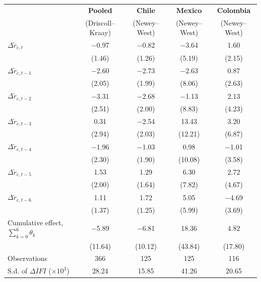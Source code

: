 \begin{tabular}{@{} l cccc @{}}
\toprule
 & \textbf{Pooled} & \textbf{Chile} & \textbf{Mexico} & \textbf{Colombia} \\
 & (Driscoll--Kraay) & (Newey--West) & (Newey--West) & (Newey--West) \\
\midrule
$\Delta\tilde r_{c,t}$ & $-$0.97 & $-$0.82 & $-$3.64 & 1.60 \\
 & (1.46) & (1.26) & (5.19) & (2.15) \\
$\Delta\tilde r_{c,t-1}$ & $-$2.60 & $-$2.73 & $-$2.63 & 0.87 \\
 & (2.05) & (1.99) & (8.06) & (2.63) \\
$\Delta\tilde r_{c,t-2}$ & $-$3.31 & $-$2.68 & $-$1.13 & 2.13 \\
 & (2.51) & (2.00) & (8.83) & (4.23) \\
$\Delta\tilde r_{c,t-3}$ & 0.31 & $-$2.54 & 13.43 & 3.20 \\
 & (2.94) & (2.03) & (12.21) & (6.87) \\
$\Delta\tilde r_{c,t-4}$ & $-$1.96 & $-$1.03 & 0.98 & $-$1.01 \\
 & (2.30) & (1.90) & (10.08) & (3.58) \\
$\Delta\tilde r_{c,t-5}$ & 1.53 & 1.29 & 6.30 & 2.72 \\
 & (2.00) & (1.64) & (7.82) & (4.67) \\
$\Delta\tilde r_{c,t-6}$ & 1.11 & 1.72 & 5.05 & $-$4.69 \\
 & (1.37) & (1.25) & (5.99) & (3.69) \\
\midrule
Cumulative effect, $\sum_{k=0}^{6}\theta_k$ & $-$5.89 & $-$6.81 & 18.36 & 4.82 \\
 & (11.64) & (10.12) & (43.84) & (17.80) \\
Observations & 366 & 125 & 125 & 116 \\
S.d. of $\Delta IFI$ ($\times10^{3}$) & 28.24 & 15.85 & 41.26 & 20.65 \\
\bottomrule
\end{tabular}